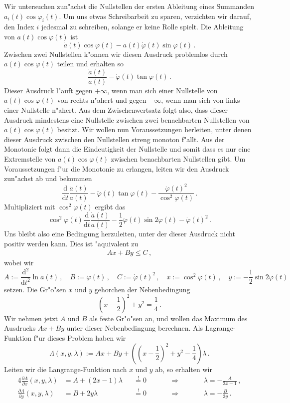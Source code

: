 \documentclass[a4paper]{scrartcl}
\newcommand{\de}{{\mathrm{d}}}
\newcommand{\pphi}{{\varphi}}
\newcommand{\defeq}{\overset{!}{=}}
\begin{document}
Wir untersuchen zun"achst die Nullstellen der ersten Ableitung eines Summanden $a_i(t)\cos\pphi_i(t)$. 
Um uns etwas Schreibarbeit zu sparen, verzichten wir darauf, den Index $i$ jedesmal zu schreiben, solange er keine Rolle spielt. 
Die Ableitung von $a(t)\cos\pphi(t)$ ist
$$ \dot a(t)\cos\pphi(t)-a(t)\dot\pphi(t)\sin\pphi(t)\,. $$
Zwischen zwei Nullstellen k"onnen wir diesen Ausdruck problemlos durch $a(t)\cos\pphi(t)$ teilen und erhalten so
$$ \frac{\dot a(t)}{a(t)}
-\dot\pphi(t)\tan\pphi(t)\,. $$
Dieser Ausdruck l"auft gegen $+\infty$, wenn man sich einer Nullstelle von $a(t)\cos\pphi(t)$ von rechts n"ahert und gegen $-\infty$, wenn man sich von links einer Nullstelle n"ahert. 
Aus dem Zwischenwertsatz folgt also, dass dieser Ausdruck mindestens eine Nullstelle zwischen zwei benachbarten Nullstellen von $a(t)\cos\pphi(t)$ besitzt. 
Wir wollen nun Voraussetzungen herleiten, unter denen dieser Ausdruck zwischen den Nullstellen streng monoton f"allt. 
Aus der Monotonie folgt dann die Eindeutigkeit der Nullstelle und somit dass es nur eine Extremstelle von $a(t)\cos\pphi(t)$ zwischen benachbarten Nullstellen gibt. 
Um Voraussetzungen f"ur die Monotonie zu erlangen, leiten wir den Ausdruck zun"achst ab und bekommen
$$ \frac{\de}{\de t}\frac{\dot a(t)}{a(t)}
-\ddot\pphi(t)\tan\pphi(t)
-\frac{\dot\pphi(t)^2}{\cos^2\pphi(t)}\,. $$
Multipliziert mit $\cos^2\pphi(t)$ ergibt das
$$ \cos^2\pphi(t)\frac{\de}{\de t}\frac{\dot a(t)}{a(t)}
-\frac12\ddot\pphi(t)\sin 2\pphi(t)
-\dot\pphi(t)^2\,. $$
Uns bleibt also eine Bedingung herzuleiten, unter der dieser Ausdruck nicht positiv werden kann. 
Dies ist "aquivalent zu
\begin{align} \label{eq:AxByC}
  Ax + By \le C\,,
\end{align}
wobei wir 
$$ 
A:=\frac{\de^2}{\de t^2}\ln a(t)\,, \quad
B:=\ddot\pphi(t)\,, \quad
C:=\dot\pphi(t)^2\,, \quad
x:=\cos^2\pphi(t)\,, \quad
y:=-\frac12\sin2\pphi(t) $$
setzen. Die Gr"o"sen $x$ und $y$ gehorchen der Nebenbedingung
$$ \left(x-\frac12\right)^2 + y^2 = \frac14\,. $$
Wir nehmen jetzt $A$ und $B$ als feste Gr"o"sen an, und wollen das Maximum des Ausdrucks $Ax+By$ unter dieser Nebenbedingung berechnen. 
Als Lagrange-Funktion f"ur dieses Problem haben wir
$$ \Lambda(x,y,\lambda) 
:= Ax + By + \left( \left(x-\frac12\right)^2 + y^2 - \frac14 \right) \lambda \,. $$
Leiten wir die Langrange-Funktion nach $x$ und $y$ ab, so erhalten wir
\begin{alignat*}{4}
  \frac{\partial\Lambda}{\partial x}(x,y,\lambda) &= A + (2x-1)\lambda &&\defeq 0 
  &\qquad&\Longrightarrow &\qquad& \lambda = -\frac{A}{2x-1}\,, \\
  \frac{\partial\Lambda}{\partial y}(x,y,\lambda) &= B +  2y   \lambda &&\defeq 0 
  && \Longrightarrow && \lambda = -\frac{B}{2y}\,.
\end{alignat*}
\end{document}
